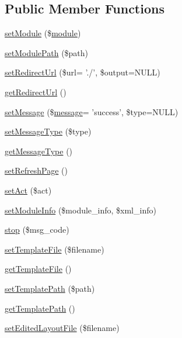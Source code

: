 \subsection*{Public Member Functions}
\begin{DoxyCompactItemize}
\item 
\hyperlink{classModuleObject_a610f40078a4c8590452eaedf794350ed}{set\-Module} (\$\hyperlink{classmodule}{module})
\item 
\hyperlink{classModuleObject_a277cebf9e472c1af7c00eab68414a567}{set\-Module\-Path} (\$path)
\item 
\hyperlink{classModuleObject_ac5126aa7f57a52e7f26b18b9040f5501}{set\-Redirect\-Url} (\$url= './', \$output=N\-U\-L\-L)
\item 
\hyperlink{classModuleObject_ae7c0b4d36f7ef9e8b3ec59a6a9bf6116}{get\-Redirect\-Url} ()
\item 
\hyperlink{classModuleObject_a90eb9095539a8905d73695afbbebbe24}{set\-Message} (\$\hyperlink{classmessage}{message}= 'success', \$type=N\-U\-L\-L)
\item 
\hyperlink{classModuleObject_a9f65f760815bb7c6667a2e521578af10}{set\-Message\-Type} (\$type)
\item 
\hyperlink{classModuleObject_aa0c2daa9dda892df56eb5fe7c754e25b}{get\-Message\-Type} ()
\item 
\hyperlink{classModuleObject_a6d0d3436c8c64591e1a3534647714969}{set\-Refresh\-Page} ()
\item 
\hyperlink{classModuleObject_a35d0b9120ea393d4b4177b0c667e198c}{set\-Act} (\$act)
\item 
\hyperlink{classModuleObject_afbcee54b026b35a2a4b4a454724bb9be}{set\-Module\-Info} (\$module\-\_\-info, \$xml\-\_\-info)
\item 
\hyperlink{classModuleObject_ac4c2bac7917c3ab3a0e816b99574727c}{stop} (\$msg\-\_\-code)
\item 
\hyperlink{classModuleObject_aa38e116023d54d3f5d8f507bb87663f4}{set\-Template\-File} (\$filename)
\item 
\hyperlink{classModuleObject_af5456f80bf7bd5d3c20dd6547423a419}{get\-Template\-File} ()
\item 
\hyperlink{classModuleObject_a440407bd8b6b16eb03115ad4a5c5835a}{set\-Template\-Path} (\$path)
\item 
\hyperlink{classModuleObject_a10f29d4a49d7e24bdab4e348633c6609}{get\-Template\-Path} ()
\item 
\hyperlink{classModuleObject_a28e95b299aeac82b450e6ed8b121ff05}{set\-Edited\-Layout\-File} (\$filename)

\end{DoxyCompactItemize}
